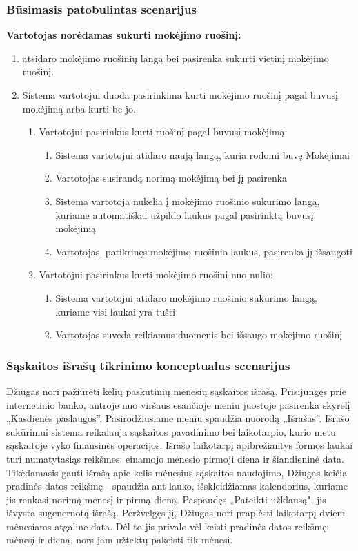 \documentclass{VUMIFPSkursinis}
\begin{document}
\subsubsection{Būsimasis patobulintas scenarijus}
\begin{center}
	\textbf{Vartotojas norėdamas sukurti mokėjimo ruošinį:}
\end{center}
\begin{enumerate}
	\item atsidaro mokėjimo ruošinių langą bei pasirenka sukurti vietinį mokėjimo ruošinį.
	\item Sistema vartotojui duoda pasirinkima kurti mokėjimo ruošinį pagal buvusį mokėjimą arba kurti be jo.
	\begin{enumerate}
		\item Vartotojui pasirinkus kurti ruošinį pagal buvusį mokėjimą:
		\begin{enumerate}
			\item Sistema vartotojui atidaro naują langą, kuria rodomi buvę Mokėjimai
			\item Vartotojas susirandą norimą mokėjimą bei jį pasirenka
			\item Sistema vartotoja nukelia į mokėjimo ruošinio sukurimo langą, kuriame automatiškai užpildo laukus pagal pasirinktą buvusį mokėjimą
			\item Vartotojas, patikrinęs mokėjimo ruošinio laukus, pasirenka jį išsaugoti
		\end{enumerate}
		\item Vartotojui pasirinkus kurti mokėjimo ruošinį nuo nulio:
		\begin{enumerate}
			\item Sistema vartotojui atidaro mokėjimo ruošinio sukūrimo langą, kuriame visi laukai yra tušti
			\item Vartotojas suveda reikiamus duomenis bei išsaugo mokėjimo ruošinį
		\end{enumerate}
	\end{enumerate}
\end{enumerate}
\subsubsection{Sąskaitos išrašų tikrinimo konceptualus scenarijus}
Džiugas nori pažiūrėti kelių paskutinių mėnesių sąskaitos išrašą. Prisijungęs prie internetinio banko, antroje nuo viršaus esančioje meniu juostoje pasirenka skyrelį „Kasdienės paslaugos”. Pasirodžiusiame meniu spaudžia nuorodą „Išrašas”. Išrašo sukūrimui sistema reikalauja sąskaitos pavadinimo bei laikotarpio, kurio metu sąskaitoje vyko finansinės operacijos. Išrašo laikotarpį apibrėžiantys formos laukai turi numatytasiąs reikšmes: einamojo mėnesio pirmoji diena ir šiandieninė data. Tikėdamasis gauti išrašą apie kelis mėnesius sąskaitos naudojimo, Džiugas keičia pradinės datos reikšmę - spaudžia ant lauko, išskleidžiamas kalendorius, kuriame jis renkasi norimą mėnesį ir pirmą dieną. Paspaudęs „Pateikti užklausą", jis išvysta sugeneruotą išrašą. Peržvelgęs jį, Džiugas nori praplėsti laikotarpį dviem mėnesiams atgaline data. Dėl to jis privalo vėl keisti pradinės datos reikšmę: mėnesį ir dieną, nors jam užtektų pakeisti tik mėnesį.
\end{document}
